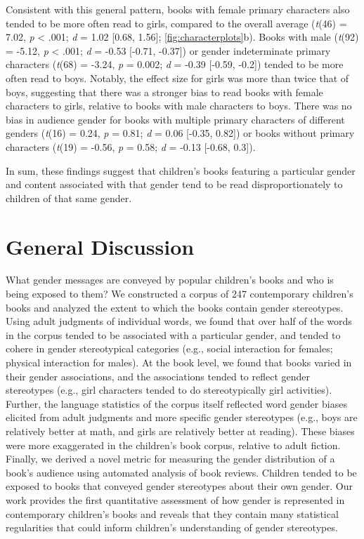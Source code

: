 \documentclass[
  english,
  ,man,floatsintext]{apa6}
\begin{document}
Consistent with this general pattern, books with female primary characters also tended to be more often read to girls, compared to the overall average (\emph{t}(46) = 7.02, \emph{p} \textless{} .001; \emph{d} = 1.02 {[}0.68, 1.56{]}; \autoref{fig:characterplots}b). Books with male (\emph{t}(92) = -5.12, \emph{p} \textless{} .001; \emph{d} = -0.53 {[}-0.71, -0.37{]}) or gender indeterminate primary characters (\emph{t}(68) = -3.24, \emph{p} = 0.002; \emph{d} = -0.39 {[}-0.59, -0.2{]}) tended to be more often read to boys. Notably, the effect size for girls was more than twice that of boys, suggesting that there was a stronger bias to read books with female characters to girls, relative to books with male characters to boys. There was no bias in audience gender for books with multiple primary characters of different genders (\emph{t}(16) = 0.24, \emph{p} = 0.81; \emph{d} = 0.06 {[}-0.35, 0.82{]}) or books without primary characters (\emph{t}(19) = -0.56, \emph{p} = 0.58; \emph{d} = -0.13 {[}-0.68, 0.3{]}).

In sum, these findings suggest that children's books featuring a particular gender and content associated with that gender tend to be read disproportionately to children of that same gender.

\hypertarget{general-discussion}{%
\section{General Discussion}\label{general-discussion}}

What gender messages are conveyed by popular children's books and who is being exposed to them? We constructed a corpus of 247 contemporary children's books and analyzed the extent to which the books contain gender stereotypes. Using adult judgments of individual words, we found that over half of the words in the corpus tended to be associated with a particular gender, and tended to cohere in gender stereotypical categories (e.g., social interaction for females; physical interaction for males). At the book level, we found that books varied in their gender associations, and the associations tended to reflect gender stereotypes (e.g., girl characters tended to do stereotypically girl activities). Further, the language statistics of the corpus itself reflected word gender biases elicited from adult judgments and more specific gender stereotypes (e.g., boys are relatively better at math, and girls are relatively better at reading). These biases were more exaggerated in the children's book corpus, relative to adult fiction. Finally, we derived a novel metric for measuring the gender distribution of a book's audience using automated analysis of book reviews. Children tended to be exposed to books that conveyed gender stereotypes about their own gender. Our work provides the first quantitative assessment of how gender is represented in contemporary children's books and reveals that they contain many statistical regularities that could inform children's understanding of gender stereotypes.
\end{document}
